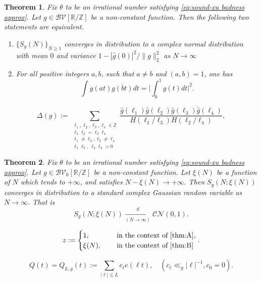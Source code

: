 \documentclass[10pt,a4paper]{amsart}
\newtheorem{thm}{Theorem}
\newcommand{\CB}{\mathcal{B}}
\newcommand{\CC}{\mathcal{C}}
\newcommand{\CN}{\mathcal{N}}
\newcommand{\CV}{\mathcal{V}}
\newcommand{\R}{\mathbb{R}}
\newcommand{\Z}{\mathbb{Z}}
\renewcommand{\geq}{\geqslant}
\renewcommand{\l}{\ell}
\renewcommand{\leq}{\leqslant}
\begin{document}
	\begin{thm}\label{thm:A}
		Fix $\theta$ to be an irrational number satisfying \eqref{eq:sound-xu badness approx}. Let $g \in \CB\CV[\R/\Z]$ be a non-constant function. Then the following two statements are equivalent.
		\begin{enumerate}
			\item  $\{S_{g}(N)\}_{N \geq 1}$ converges in distribution to a complex normal distribution with mean $0$ and variance $1-|\hat{g}(0)|^2/\|g\|_2^2$ as $N \to \infty$
			\item For all positive integers $a,b$, such that $a \ne b$ and $(a,b) = 1$, one has $$\int g(at)\overline{g(bt)}dt = \bigg|\int_0^1 g(t)dt \bigg|^2.$$
		\end{enumerate}
	\end{thm}

		\begin{equation}\label{eq: def Delta}
			\Delta(g) :=  \sum_{\substack{\l_1,\l_2,\l_3,\l_4 \in \Z \\ \l_1\l_2 = \l_3\l_4 \\ \l_1 \ne \l_3, \l_2 \ne \l_4 \\ \l_1 \l_3,\: \l_2\l_4 > 0}}\frac{\hat{g}(\l_1)\hat{g}(\l_2) \overline{\hat{g}(\l_3)\hat{g}(\l_4)}}{H(\l_1/\l_3)H(\l_2/\l_4)},
		\end{equation}

	\begin{thm}\label{thm:B}
		Fix $\theta$ to be an irrational number satisfying \eqref{eq:sound-xu badness approx}. Let $g \in \CB\CV_0[\R/\Z]$ be a non-constant function. Let $\xi(N)$ be a function of $N$ which tends to $+\infty$, and satisfies $N-\xi(N) \to +\infty.$ Then $S_{g}(N;\xi(N))$ converges in distribution to a standard complex Gaussian random variable as $N \to \infty$. That is
		$$S_{g}(N;\xi(N)) \xrightarrow[(N \to \infty)]{d} \CC\CN(0,1).$$
	\end{thm}

	\begin{equation}\label{eq: def z}
		z := \begin{cases}
			1, \quad & \text{ in the context of \Cref{thm:A}},\\
			\xi(N), \quad & \text{ in the context of \Cref{thm:B}}
		\end{cases}.
	\end{equation}

	\begin{equation}\label{eq: def trig poly}
		Q(t) = Q_{L,g}(t) := \sum_{|\l| \leq L} c_\l e(\l t), \quad (c_\l \ll_g |\l|^{-1}, c_0 = 0).
	\end{equation}
\end{document}
